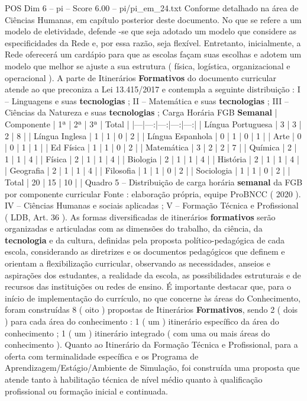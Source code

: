 \begin{textsample}{POS Dim 6 – pi – Score 6.00 – pi/pi\_em\_24.txt}
Conforme detalhado na área de Ciências Humanas, em capítulo posterior deste documento.
No que se refere a um modelo de eletividade, defende -se que seja adotado um modelo que considere as especificidades da Rede e, por essa razão, seja flexível.
Entretanto, inicialmente, a Rede oferecerá um cardápio para que as escolas façam suas escolhas e adotem um modelo que melhor se ajuste a sua estrutura ( física, logística, organizacional e operacional ).
A parte de Itinerários \textbf{Formativos} do documento curricular atende ao que preconiza a Lei 13.415/2017 e contempla a seguinte distribuição : I – Linguagens e suas \textbf{tecnologias} ; II – Matemática e suas \textbf{tecnologias} ; III – Ciências da Natureza e suas \textbf{tecnologias} ; Carga Horária FGB \textbf{Semanal} | Componente | 1ª | 2ª | 3ª | Total | |---|---:|---:|---:|---:| | Língua Portuguesa | 3 | 3 | 2 | 8 | | Língua Inglesa | 1 | 1 | 0 | 2 | | Língua Espanhola | 0 | 1 | 0 | 1 | | Arte | 0 | 0 | 1 | 1 | | Ed Física | 1 | 1 | 0 | 2 | | Matemática | 3 | 2 | 2 | 7 | | Química | 2 | 1 | 1 | 4 | | Física | 2 | 1 | 1 | 4 | | Biologia | 2 | 1 | 1 | 4 | | História | 2 | 1 | 1 | 4 | | Geografia | 2 | 1 | 1 | 4 | | Filosofia | 1 | 1 | 0 | 2 | | Sociologia | 1 | 1 | 0 | 2 | | Total | 20 | 15 | 10 | | Quadro 5 – Distribuição de carga horária \textbf{semanal} da FGB por componente curricular Fonte : elaboração própria, equipe ProBNCC ( 2020 ).
IV – Ciências Humanas e sociais aplicadas ; V – Formação Técnica e Profissional ( LDB, Art. 36 ).
As formas diversificadas de itinerários \textbf{formativos} serão organizadas e articuladas com as dimensões do trabalho, da ciência, da \textbf{tecnologia} e da cultura, definidas pela proposta político-pedagógica de cada escola, considerando as diretrizes e os documentos pedagógicos que definem e orientam a flexibilização curricular, observando as necessidades, anseios e aspirações dos estudantes, a realidade da escola, as possibilidades estruturais e de recursos das instituições ou redes de ensino.
É importante destacar que, para o início de implementação do currículo, no que concerne às áreas do Conhecimento, foram construídas 8 ( oito ) propostas de Itinerários \textbf{Formativos}, sendo 2 ( dois ) para cada área do conhecimento : 1 ( um ) itinerário específico da área do conhecimento ; 1 ( um ) itinerário integrado ( com uma ou mais áreas do conhecimento ).
Quanto ao Itinerário da Formação Técnica e Profissional, para a oferta com terminalidade específica e os Programa de Aprendizagem/Estágio/Ambiente de Simulação, foi construída uma proposta que atende tanto à habilitação técnica de nível médio quanto à qualificação profissional ou formação inicial e continuada.

\end{textsample}
